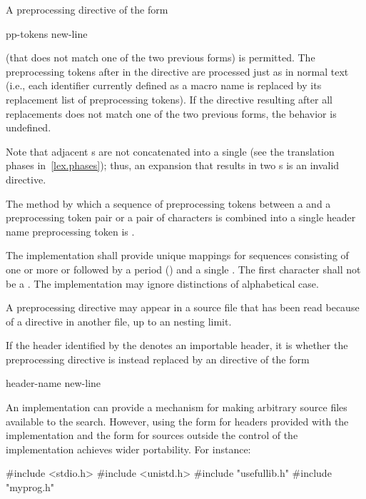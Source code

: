 \pnum
A preprocessing directive of the form
\begin{ncsimplebnf}
 pp-tokens new-line
\end{ncsimplebnf}
(that does not match one of the two previous forms) is permitted.
The preprocessing tokens after
in the directive are processed just as in normal text
(i.e., each identifier currently defined as a macro name is replaced by its
replacement list of preprocessing tokens).
If the directive resulting after all replacements does not match
one of the two previous forms, the behavior is
undefined.
\begin{footnote}
Note that adjacent s are not concatenated into
a single 
(see the translation phases in~\ref{lex.phases});
thus, an expansion that results in two s is an
invalid directive.
\end{footnote}
The method by which a sequence of preprocessing tokens between a
\tcode{<}
and a
\tcode{>}
preprocessing token pair or a pair of
characters is combined into a single header name
preprocessing token is .

\pnum
The implementation shall provide unique mappings for
sequences consisting of one or more
 or 
followed by a period
()
and a single
.
The first character shall not be a .
The implementation may ignore distinctions of alphabetical case.

\pnum
A
preprocessing directive may appear
in a source file that has been read because of a
directive in another file,
up to an  nesting limit.

\pnum
If the header identified by the 
denotes an importable header,
it is
whether the  preprocessing directive
is instead replaced by an  directive of the form
\begin{ncbnf}
 header-name \terminal{;} new-line
\end{ncbnf}

\pnum
\begin{note}
An implementation can provide a mechanism for making arbitrary
source files available to the \tcode{< >} search.
However, using the \tcode{< >} form for headers provided
with the implementation and the  form for sources
outside the control of the implementation
achieves wider portability. For instance:

\begin{codeblock}
#include <stdio.h>
#include <unistd.h>
#include "usefullib.h"
#include "myprog.h"
\end{codeblock}

\end{note}

